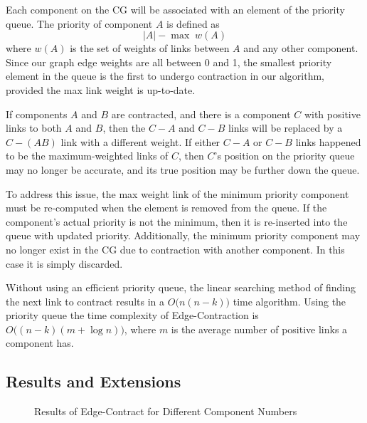 Each component on the CG will be associated with an element of the
priority queue. The priority of component $A$ is defined as
\[ |A| - \max\;w(A) \]
where $w(A)$ is the set of weights of links between $A$ and any other
component. Since our graph edge weights are all between 0 and 1,
the smallest priority element in the queue is the first to undergo
contraction in our algorithm, provided the max link weight is up-to-date.

If components $A$ and $B$ are contracted, and there is a component $C$
with positive links to both $A$ and $B$, then the $C-A$ and $C-B$ links
will be replaced by a $C-(AB)$ link with a different weight. If either
$C-A$ or $C-B$ links happened to be the maximum-weighted links of $C$,
then $C$'s position on the priority queue may no longer be accurate, and
its true position may be further down the queue.

To address this issue, the max weight link of the minimum priority
component must be re-computed when the element is removed from the queue.
If the component's actual priority is not the minimum, then it is
re-inserted into the queue with updated priority.
Additionally, the minimum priority component may no longer exist in the
CG due to contraction with another component. In this case it is simply
discarded.

Without using an efficient priority queue, the linear searching method
of finding the next link to contract results in a $O\big(n (n-k)\big)$
time algorithm. Using the priority queue the time complexity of
Edge-Contraction is $O \big((n - k) (m + \log n)\big)$, where $m$ is
the average number of positive links a component has.

\subsection{Results and Extensions}

\begin{figure}
\caption{Results of Edge-Contract for Different Component Numbers}
\end{figure}

